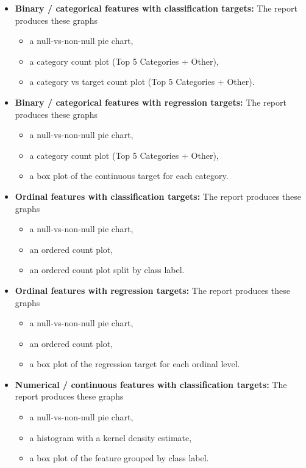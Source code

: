 \begin{itemize}
  \item \textbf{Binary / categorical features with classification targets:} The report produces these graphs
    \begin{itemize}
      \item a null-vs-non-null pie chart,
      \item a category count plot (Top 5 Categories + Other),
      \item a category vs target count plot (Top 5 Categories + Other).
    \end{itemize}
  \item \textbf{Binary / categorical features with regression targets:} The report produces these graphs
    \begin{itemize}
      \item a null-vs-non-null pie chart,
      \item a category count plot (Top 5 Categories + Other),
      \item a box plot of the continuous target for each category.
    \end{itemize}
  \item \textbf{Ordinal features with classification targets:} The report produces these graphs
    \begin{itemize}
      \item a null-vs-non-null pie chart,
      \item an ordered count plot,
      \item an ordered count plot split by class label.
    \end{itemize}
  \item \textbf{Ordinal features with regression targets:} The report  produces these graphs
    \begin{itemize}
      \item a null-vs-non-null pie chart,
      \item an ordered count plot,
      \item a box plot of the regression target for each ordinal level.
    \end{itemize}
  \item \textbf{Numerical / continuous features with classification targets:} The report  produces these graphs
    \begin{itemize}
      \item a null-vs-non-null pie chart,
      \item a histogram with a kernel density estimate,
      \item a box plot of the feature grouped by class label.

\end{itemize}
\end{itemize}
